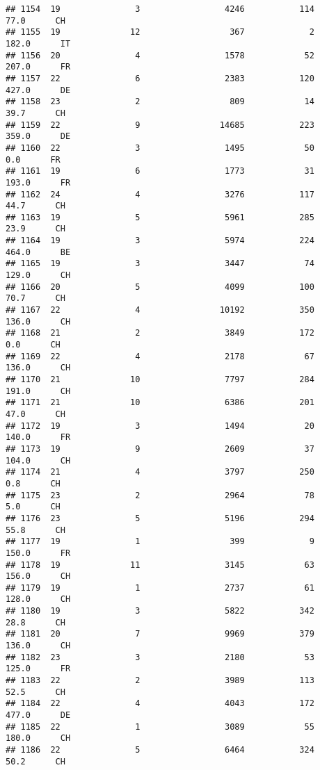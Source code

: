 \documentclass[
]{article}
\begin{document}
\begin{verbatim}
## 1154  19               3                 4246           114     77.0      CH
## 1155  19              12                  367             2    182.0      IT
## 1156  20               4                 1578            52    207.0      FR
## 1157  22               6                 2383           120    427.0      DE
## 1158  23               2                  809            14     39.7      CH
## 1159  22               9                14685           223    359.0      DE
## 1160  22               3                 1495            50      0.0      FR
## 1161  19               6                 1773            31    193.0      FR
## 1162  24               4                 3276           117     44.7      CH
## 1163  19               5                 5961           285     23.9      CH
## 1164  19               3                 5974           224    464.0      BE
## 1165  19               3                 3447            74    129.0      CH
## 1166  20               5                 4099           100     70.7      CH
## 1167  22               4                10192           350    136.0      CH
## 1168  21               2                 3849           172      0.0      CH
## 1169  22               4                 2178            67    136.0      CH
## 1170  21              10                 7797           284    191.0      CH
## 1171  21              10                 6386           201     47.0      CH
## 1172  19               3                 1494            20    140.0      FR
## 1173  19               9                 2609            37    104.0      CH
## 1174  21               4                 3797           250      0.8      CH
## 1175  23               2                 2964            78      5.0      CH
## 1176  23               5                 5196           294     55.8      CH
## 1177  19               1                  399             9    150.0      FR
## 1178  19              11                 3145            63    156.0      CH
## 1179  19               1                 2737            61    128.0      CH
## 1180  19               3                 5822           342     28.8      CH
## 1181  20               7                 9969           379    136.0      CH
## 1182  23               3                 2180            53    125.0      FR
## 1183  22               2                 3989           113     52.5      CH
## 1184  22               4                 4043           172    477.0      DE
## 1185  22               1                 3089            55    180.0      CH
## 1186  22               5                 6464           324     50.2      CH

\end{verbatim}
\end{document}
